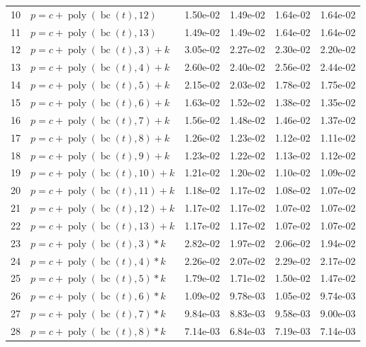 \documentclass[12pt,a4paper]{article}
\DeclareMathOperator{\bc}{bc}
\DeclareMathOperator{\poly}{poly}
\begin{document}
\begin{longtable}[t]{ll>{\raggedleft\arraybackslash}p{2cm}>{\raggedleft\arraybackslash}p{2cm}>{\raggedleft\arraybackslash}p{2cm}>{\raggedleft\arraybackslash}p{2cm}}
10 & $p = c + \poly\left( \bc(t), 12 \right)$ & 1.50e-02 & 1.49e-02 & 1.64e-02 & 1.64e-02\\
\rowcolor{gray!6}  11 & $p = c + \poly\left( \bc(t), 13 \right)$ & 1.49e-02 & 1.49e-02 & 1.64e-02 & 1.64e-02\\
12 & $p = c + \poly\left( \bc(t), 3 \right) + k$ & 3.05e-02 & 2.27e-02 & 2.30e-02 & 2.20e-02\\
\rowcolor{gray!6}  13 & $p = c + \poly\left( \bc(t), 4 \right) + k$ & 2.60e-02 & 2.40e-02 & 2.56e-02 & 2.44e-02\\
14 & $p = c + \poly\left( \bc(t), 5 \right) + k$ & 2.15e-02 & 2.03e-02 & 1.78e-02 & 1.75e-02\\
\rowcolor{gray!6}  15 & $p = c + \poly\left( \bc(t), 6 \right) + k$ & 1.63e-02 & 1.52e-02 & 1.38e-02 & 1.35e-02\\
16 & $p = c + \poly\left( \bc(t), 7 \right) + k$ & 1.56e-02 & 1.48e-02 & 1.46e-02 & 1.37e-02\\
\rowcolor{gray!6}  17 & $p = c + \poly\left( \bc(t), 8 \right) + k$ & 1.26e-02 & 1.23e-02 & 1.12e-02 & 1.11e-02\\
18 & $p = c + \poly\left( \bc(t), 9 \right) + k$ & 1.23e-02 & 1.22e-02 & 1.13e-02 & 1.12e-02\\
\rowcolor{gray!6}  19 & $p = c + \poly\left( \bc(t), 10 \right) + k$ & 1.21e-02 & 1.20e-02 & 1.10e-02 & 1.09e-02\\
20 & $p = c + \poly\left( \bc(t), 11 \right) + k$ & 1.18e-02 & 1.17e-02 & 1.08e-02 & 1.07e-02\\
\rowcolor{gray!6}  21 & $p = c + \poly\left( \bc(t), 12 \right) + k$ & 1.17e-02 & 1.17e-02 & 1.07e-02 & 1.07e-02\\
22 & $p = c + \poly\left( \bc(t), 13 \right) + k$ & 1.17e-02 & 1.17e-02 & 1.07e-02 & 1.07e-02\\
\rowcolor{gray!6}  23 & $p = c + \poly\left( \bc(t), 3 \right) * k$ & 2.82e-02 & 1.97e-02 & 2.06e-02 & 1.94e-02\\
24 & $p = c + \poly\left( \bc(t), 4 \right) * k$ & 2.26e-02 & 2.07e-02 & 2.29e-02 & 2.17e-02\\
\rowcolor{gray!6}  25 & $p = c + \poly\left( \bc(t), 5 \right) * k$ & 1.79e-02 & 1.71e-02 & 1.50e-02 & 1.47e-02\\
26 & $p = c + \poly\left( \bc(t), 6 \right) * k$ & 1.09e-02 & 9.78e-03 & 1.05e-02 & 9.74e-03\\
\rowcolor{gray!6}  27 & $p = c + \poly\left( \bc(t), 7 \right) * k$ & 9.84e-03 & 8.83e-03 & 9.58e-03 & 9.00e-03\\
28 & $p = c + \poly\left( \bc(t), 8 \right) * k$ & 7.14e-03 & 6.84e-03 & 7.19e-03 & 7.14e-03\\

\end{longtable}
\end{document}
